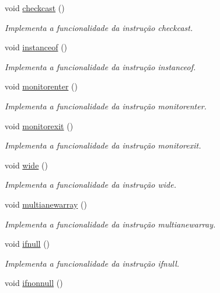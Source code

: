 \begin{DoxyCompactItemize}
void \hyperlink{classOperations_aa4f0f3c8617af197e4a4e2dc62cb9c35}{checkcast} ()
\begin{DoxyCompactList}\small\item\em Implementa a funcionalidade da instrução checkcast. \end{DoxyCompactList}\item 
void \hyperlink{classOperations_a22e16734b441e5cf7e6bdfb09fb152fa}{instanceof} ()
\begin{DoxyCompactList}\small\item\em Implementa a funcionalidade da instrução instanceof. \end{DoxyCompactList}\item 
void \hyperlink{classOperations_a4d62d66d9e60667ed4e689cd6a44ecaa}{monitorenter} ()
\begin{DoxyCompactList}\small\item\em Implementa a funcionalidade da instrução monitorenter. \end{DoxyCompactList}\item 
void \hyperlink{classOperations_af3fc8364ad200be676ea35e4b918e8e6}{monitorexit} ()
\begin{DoxyCompactList}\small\item\em Implementa a funcionalidade da instrução monitorexit. \end{DoxyCompactList}\item 
void \hyperlink{classOperations_ab1474dfc4eb5142361b00d185f0a4a2b}{wide} ()
\begin{DoxyCompactList}\small\item\em Implementa a funcionalidade da instrução wide. \end{DoxyCompactList}\item 
void \hyperlink{classOperations_a78c45edfcdf63668974ffc3b2d84a309}{multianewarray} ()
\begin{DoxyCompactList}\small\item\em Implementa a funcionalidade da instrução multianewarray. \end{DoxyCompactList}\item 
void \hyperlink{classOperations_a030f5995f8f357254e543d0cbce2d189}{ifnull} ()
\begin{DoxyCompactList}\small\item\em Implementa a funcionalidade da instrução ifnull. \end{DoxyCompactList}\item 
void \hyperlink{classOperations_a00af7ab198690f5d3e6c7f2b2d374194}{ifnonnull} ()

\end{DoxyCompactItemize}
